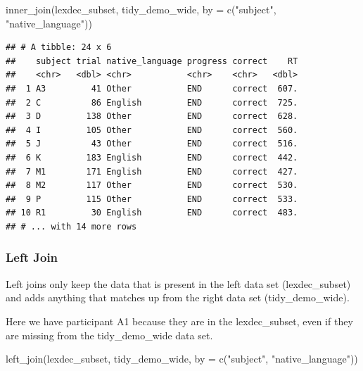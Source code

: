 \documentclass[
]{book}
\newenvironment{Shaded}{\begin{snugshade}}{\end{snugshade}}
\newcommand{\AttributeTok}[1]{\textcolor[rgb]{0.77,0.63,0.00}{#1}}
\newcommand{\FunctionTok}[1]{\textcolor[rgb]{0.00,0.00,0.00}{#1}}
\newcommand{\NormalTok}[1]{#1}
\newcommand{\StringTok}[1]{\textcolor[rgb]{0.31,0.60,0.02}{#1}}
\begin{document}
\begin{Shaded}
\begin{Highlighting}[]
\FunctionTok{inner\_join}\NormalTok{(lexdec\_subset, tidy\_demo\_wide, }\AttributeTok{by =} \FunctionTok{c}\NormalTok{(}\StringTok{"subject"}\NormalTok{, }\StringTok{"native\_language"}\NormalTok{))}
\end{Highlighting}
\end{Shaded}

\begin{verbatim}
## # A tibble: 24 x 6
##    subject trial native_language progress correct    RT
##    <chr>   <dbl> <chr>           <chr>    <chr>   <dbl>
##  1 A3         41 Other           END      correct  607.
##  2 C          86 English         END      correct  725.
##  3 D         138 Other           END      correct  628.
##  4 I         105 Other           END      correct  560.
##  5 J          43 Other           END      correct  516.
##  6 K         183 English         END      correct  442.
##  7 M1        171 English         END      correct  427.
##  8 M2        117 Other           END      correct  530.
##  9 P         115 Other           END      correct  533.
## 10 R1         30 English         END      correct  483.
## # ... with 14 more rows
\end{verbatim}

\hypertarget{left-join}{%
\subsubsection{Left Join}\label{left-join}}

Left joins only keep the data that is present in the left data set (lexdec\_subset) and adds anything that matches up from the right data set (tidy\_demo\_wide).

Here we have participant A1 because they are in the lexdec\_subset, even if they are missing from the tidy\_demo\_wide data set.

\begin{Shaded}
\begin{Highlighting}[]
\FunctionTok{left\_join}\NormalTok{(lexdec\_subset, tidy\_demo\_wide, }\AttributeTok{by =} \FunctionTok{c}\NormalTok{(}\StringTok{"subject"}\NormalTok{, }\StringTok{"native\_language"}\NormalTok{))}
\end{Highlighting}
\end{Shaded}
\end{document}

